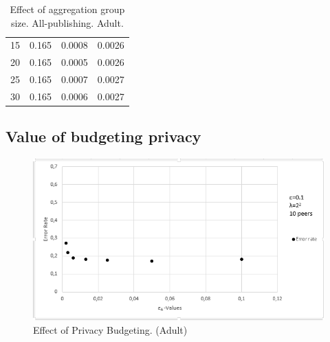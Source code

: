 \begin{table}[H]
\begin{tabular}{|l|l|l|l|}
		15                                                          & 0.165                                                       & 0.0008                                                           & 0.0026                                                               \\
		20                                                          & 0.165                                                       & 0.0005                                                           & 0.0026                                                               \\
		25                                                          & 0.165                                                       & 0.0007                                                           & 0.0027                                                               \\
		30                                                          & 0.165                                                       & 0.0006                                                           & 0.0027                                                              
	\end{tabular}
	\caption{Effect of aggregation group size. All-publishing. Adult.}
	\label{tab:results_groupsize_all}
\end{table}

\subsection{Value of budgeting privacy}

\begin{figure}[H]
	\centering
	\includegraphics[width=.8\textwidth]{fig/adult/results_privacy_budget}
	\caption{Effect of Privacy Budgeting. (Adult)}
	\label{fig:results_privacy_budget}
\end{figure}




\cleardoublepage